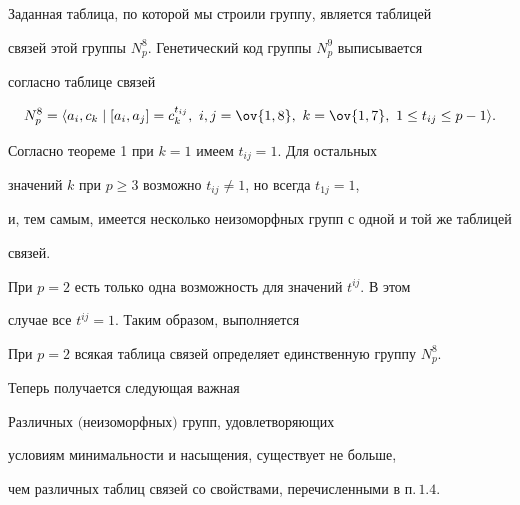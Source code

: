 Заданная таблица, по которой мы строили группу, является таблицей 


связей этой группы $N^8_p$. Генетический код группы $N^9_p$ выписывается 


согласно таблице связей


$$


N^8_p=\la a_i,c_k\mid[a_i,a_j]=c^{t_{ij}}_k,\ i,j=\ov{1,8},


\ k=\ov{1,7},\ 1\le t_{ij}\le p-1\ra.


$$


Согласно теореме 1 при $k=1$ имеем $t_{ij}=1$. Для остальных


значений $k$ при $p\ge3$ возможно $t_{ij}\ne1$, но всегда $t_{1j}=1$,


и, тем самым, имеется несколько неизоморфных групп с одной и той же таблицей


связей.





При $p=2$ есть только одна возможность для значений $t^{ij}$. В этом


случае все $t^{ij}=1$. Таким образом, выполняется








\begin{thm}


При $p=2$ всякая таблица связей определяет единственную группу $N^8_p$.


\end{thm}





Теперь получается следующая важная








\begin{thm}


Различных $($неизоморфных$)$ групп, удовлетворяющих 


условиям минимальности и насыщения, существует не больше, 


чем различных таблиц связей со свойствами, перечисленными в п.\,$1.4$.


\end{thm}








